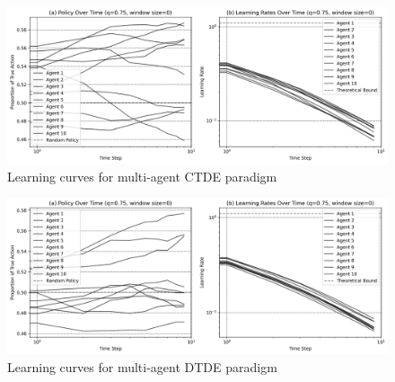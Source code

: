 \begin{figure}[htbp]
    \centering
    \includegraphics[width=1\textwidth]{../charts/multi_agent_ctde_learning_curves_q=0.75.png}
    \caption{Learning curves for multi-agent CTDE paradigm} 
    \label{fig:multi-learning-curves-ctde}
\end{figure}

\begin{figure}[htbp]
    \centering
    \includegraphics[width=1\textwidth]{../charts/multi_agent_dtde_learning_curves_q=0.75.png}
    \caption{Learning curves for multi-agent DTDE paradigm} 
    \label{fig:multi-learning-curves-dtde}
\end{figure}

\pagebreak